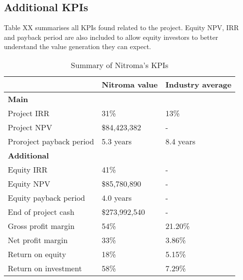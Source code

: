 \subsection{Additional KPIs}
Table XX summarises all KPIs found related to the project. Equity NPV, IRR and payback period are also included to allow equity investors to better understand the value generation they can expect. 

\begin{table}[h]
    \centering
    \caption{Summary of Nitroma's KPIs}
    \label{tab:kpi-main-summary}
\begin{tabular}{@{}lll@{}}
\toprule
                         & Nitroma value & Industry average \\ \midrule
\textbf{Main}            &               &                  \\
Project IRR              & 31\%          & 13\%             \\
Project NPV              & \$84,423,382  & -                \\
Proroject payback period & 5.3 years     & 8.4 years        \\
\textbf{Additional}      &               &                  \\
Equity IRR               & 41\%          & -                \\
Equity NPV               & \$85,780,890  & -                \\
Equity payback period    & 4.0 years     & -                \\
End of project cash      & \$273,992,540 & -                \\
Gross profit margin      & 54\%          & 21.20\%          \\
Net profit margin        & 33\%          & 3.86\%           \\
Return on equity         & 18\%          & 5.15\%           \\
Return on investment     & 58\%          & 7.29\%           \\ \bottomrule
\end{tabular}
\end{table}